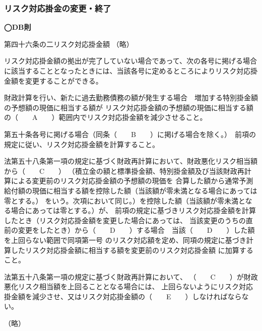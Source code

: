 \newpage

\subsubsection{リスク対応掛金の変更・終了}

\begin{fillblank}[数理人試験 2020 問題1 設問1 C〜G]
  \noindent \textbf{◯DB則}
  \begin{lawstructure}
    \begin{lawarticle}{第四十六条の二}{リスク対応掛金額}
      （略）

      リスク対応掛金額の拠出が完了していない場合であって、次の各号に掲げる場合に該当することとなったときには、当該各号に定めるところによりリスク対応掛金額を変更することができる。

      財政計算を行い、新たに過去勤務債務の額が発生する場合　増加する特別掛金額の予想額の現価に相当する額が
      リスク対応掛金額の予想額の現価に相当する額の（　　A　　）範囲内でリスク対応掛金額を減少させること。

      第五十条各号に掲げる場合（同条（　　B　　）に掲げる場合を除く。）　前項の規定に従い、リスク対応掛金額を計算すること。

      法第五十八条第一項の規定に基づく財政再計算において、財政悪化リスク相当額から（　　C　　）
      （積立金の額と標準掛金額、特別掛金額及び当該財政再計算による変更前のリスク対応掛金額の予想額の現価を
      合算した額から通常予測給付額の現価に相当する額を控除した額（当該額が零未満となる場合にあっては零とする。）
      をいう。次項において同じ。）を控除した額（当該額が零未満となる場合にあっては零とする。）が、
      前項の規定に基づきリスク対応掛金額を計算したとき（リスク対応掛金額を変更した場合にあっては、
      当該変更のうちの直前の変更をしたとき）から（　　D　　）する場合　当該（　　D　　）した額を上回らない範囲で同項第一号
      のリスク対応額を定め、同項の規定に基づき計算したリスク対応掛金額に相当する額を変更前のリスク対応掛金額
      に加算すること。

      法第五十八条第一項の規定に基づく財政再計算において、
      （　　C　　）が財政悪化リスク相当額を上回ることとなる場合には、
      上回らないようにリスク対応掛金額を減少させ、又はリスク対応掛金額の（　　E　　）しなければならない。

      （略）
    \end{lawarticle}
  \end{lawstructure}
\end{fillblank}

